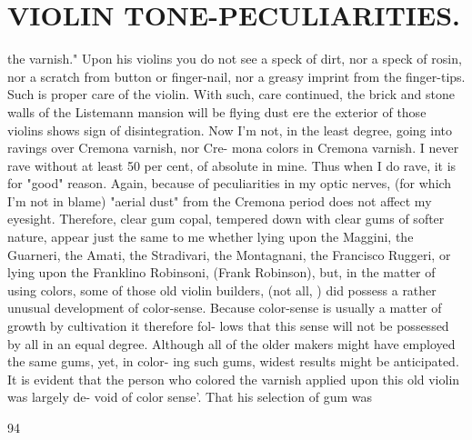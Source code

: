 \documentclass{article}
\begin{document}
\section*{VIOLIN TONE-PECULIARITIES.}
the varnish." Upon his violins you do not see a speck of dirt, nor a speck of rosin, nor a scratch from button or finger-nail, nor a greasy imprint from the finger-tips. Such is proper care of the violin. With such, care continued, the brick and stone walls of the Listemann mansion will be flying dust ere the exterior of those violins shows sign of disintegration. Now I'm not, in the least degree, going into ravings over Cremona varnish, nor Cre- mona colors in Cremona varnish. I never rave without at least 50 per cent, of absolute in mine. Thus when I do rave, it is for "good" reason. Again, because of peculiarities in my optic nerves, (for which I'm not in blame) "aerial dust" from the Cremona period does not affect my eyesight. Therefore, clear gum copal, tempered down with clear gums of softer nature, appear just the same to me whether lying upon the Maggini, the Guarneri, the Amati, the Stradivari, the Montagnani, the Francisco Ruggeri, or lying upon the Franklino Robinsoni, (Frank Robinson), but, in the matter of using colors, some of those old violin builders, (not all, ) did possess a rather unusual development of color-sense. Because color-sense is usually a matter of growth by cultivation it therefore fol- lows that this sense will not be possessed by all in an equal degree. Although all of the older makers might have employed the same gums, yet, in color- ing such gums, widest results might be anticipated. It is evident that the person who colored the varnish applied upon this old violin was largely de- void of color sense'. That his selection of gum was

94
\end{document}
